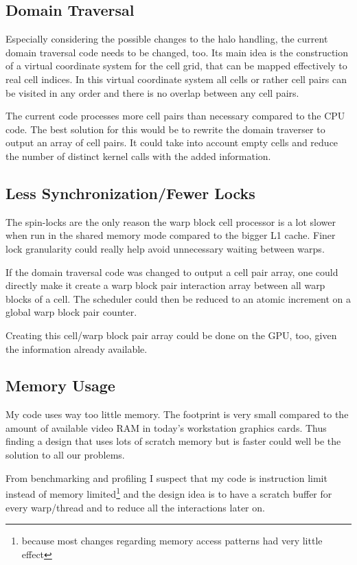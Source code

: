 \subsection{Domain Traversal}
Especially considering the possible changes to the halo handling, the current domain traversal code needs to be changed, too. Its main idea is the construction of a virtual coordinate system for the cell grid, that can be mapped effectively to real cell indices. In this virtual coordinate system all cells or rather cell pairs can be visited in any order and there is no overlap between any cell pairs.

The current code processes more cell pairs than necessary compared to the CPU code. The best solution for this would be to rewrite the domain traverser to output an array of cell pairs. It could take into account empty cells and reduce the number of distinct kernel calls with the added information.

\subsection{Less Synchronization/Fewer Locks}
The spin-locks are the only reason the warp block cell processor is a lot slower when run in the shared memory mode compared to the bigger L1 cache. Finer lock granularity could really help avoid unnecessary waiting between warps.

If the domain traversal code was changed to output a cell pair array, one could directly make it create a warp block pair interaction array between all warp blocks of a cell. The scheduler could then be reduced to an atomic increment on a global warp block pair counter.

Creating this cell/warp block pair array could be done on the GPU, too, given the information already available.

\subsection{Memory Usage}
My code uses way too little memory. The footprint is very small compared to the amount of available video RAM in today's workstation graphics cards. Thus finding a design that uses lots of scratch memory but is faster could well be the solution to all our problems.

From benchmarking and profiling I suspect that my code is instruction limit instead of memory limited\footnote{because most changes regarding memory access patterns had very little effect} and the design idea is to have a scratch buffer for every warp/thread and to reduce all the interactions later on.

